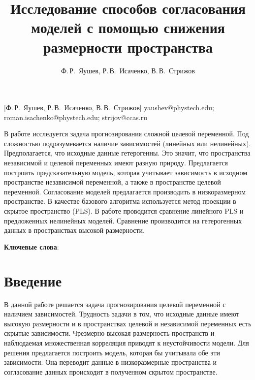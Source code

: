 \documentclass[12pt, twoside]{article}
\begin{document}
\title
    [Исследование способов согласования моделей с помощью снижения размерности пространства] %
    {Исследование способов согласования моделей с помощью снижения размерности пространства}
\author
    [Ф.\,Р.~Яушев, Р.\,В.~Исаченко, В.\,В.~Стрижов] %
    {Ф.\,Р.~Яушев, Р.\,В.~Исаченко, В.\,В.~Стрижов} %
    [Ф.\,Р.~Яушев, Р.\,В.~Исаченко, В.\,В.~Стрижов] %
\email
    {yaushev@phystech.edu; roman.isachenko@phystech.edu; strijov@ccas.ru}

\abstract
    {В работе исследуется задача прогнозирования сложной целевой переменной. Под сложностью подразумевается наличие зависимостей (линейных или нелинейных). Предполагается, что исходные данные гетерогенны. Это значит, что пространства независимой и целевой переменных имеют разную природу. Предлагается построить предсказательную модель, которая учитывает зависимость в исходном пространстве независимой переменной, а также в пространстве целевой переменной. Согласование моделей предлагается производить в низкоразмерном пространстве. В качестве базового алгоритма используется метод проекции в скрытое пространство (PLS). В работе проводится сравнение линейного PLS и предложенных нелинейных моделей. Сравнение производится на гетерогенных данных в пространствах высокой размерности.
	
\bigskip
\noindent
\textbf{Ключевые слова}: \emph {}
}





\maketitle

\section{Введение}
В данной работе решается задача прогнозирования целевой переменной с наличием зависимостей. Трудность задачи в том, что исходные данные имеют высокую размерности и в пространствах целевой и независимой переменных есть скрытые зависимости. Чрезмерно высокая размерность пространств и наблюдаемая множественная корреляция приводят к неустойчивости модели. Для решения предлагается построить модель, которая бы учитывала обе эти зависимости. Она переводит данные в низкоразмерные пространства и согласование данных происходит в полученном скрытом пространстве.
\end{document}
